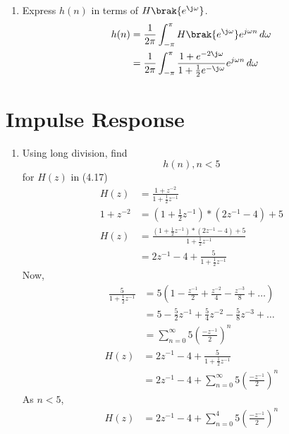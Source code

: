 \documentclass[journal,12pt,twocolumn]{IEEEtran}
\renewcommand\thesection{\arabic{section}}
\begin{document}
\begin{enumerate}[label=\thesection.\arabic*]
\item Express $h(n)$ in terms of $H\brak{e^{\j \omega}}$. \\
\solution
\begin{align}
     h(n) &= \frac{1}{2\pi} \int_{-\pi}^{\pi} H\brak{e^{\j \omega}}e^{j\omega n} \,d\omega \\
     &= \frac{1}{2\pi} \int_{-\pi}^{\pi} \frac{1 + e^{-2\j\omega}}{1 + \frac12 e^{-\j\omega}} e^{j\omega n} \,d\omega 
\end{align}

\end{enumerate}


\section{Impulse Response}
\begin{enumerate}[label=\thesection.\arabic*]
\item Using long division, find
\begin{equation}
     h(n),  n<5
\end{equation}
for $H(z)$ in (4.17) \\
\solution
\begin{align}
     H(z) &= \frac{1 + z^{-2}}{1 + \frac{1}{2}z^{-1}} \\
     1+z^{-2} &= \left(1 + \frac{1}{2}z^{-1}\right)*\left(2z^{-1}-4\right) + 5 \\
     H(z)&= \frac{\left(1 + \frac{1}{2}z^{-1}\right)*\left(2z^{-1}-4\right) + 5}{1 + \frac{1}{2}z^{-1}} \\
     &= 2z^{-1}-4 + \frac{5}{1 + \frac{1}{2}z^{-1}}
\end{align}
Now,
\begin{align}
     \frac{5}{1 + \frac{1}{2}z^{-1}} &= 5\left(1-\frac{z^{-1}}{2}+\frac{z^{-2}}{4}-\frac{z^{-3}}{8}+\dots\right) \\
     &= 5-\frac{5}{2}z^{-1}+\frac{5}{4}z^{-2}-\frac{5}{8}z^{-3}+\dots \\
     &= \sum_{n = 0}^{\infty}  5 \left(\frac{-z^{-1}}{2}\right)^n
\end{align}
\begin{align}
     H(z)&= 2z^{-1}-4 + \frac{5}{1 + \frac{1}{2}z^{-1}} \\
     &= 2z^{-1}-4 + \sum_{n = 0}^{\infty}  5 \left(\frac{-z^{-1}}{2}\right)^n 
\end{align}
As $n<5$,
\begin{align}
     H(z) &= 2z^{-1}-4 + \sum_{n = 0}^{4}  5 \left(\frac{-z^{-1}}{2}\right)^n \\

\end{align}
\end{enumerate}
\end{document}
